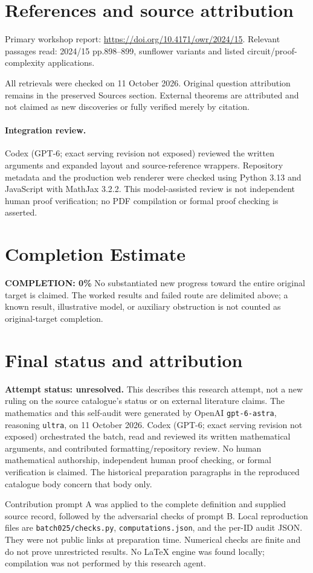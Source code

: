 \documentclass[11pt]{article}
\begin{document}
\section{References and source attribution}
Primary workshop report: \url{https://doi.org/10.4171/owr/2024/15}. Relevant passages read: 2024/15 pp.898--899, sunflower variants and listed circuit/proof-complexity applications.

All retrievals were checked on 11 October 2026. Original question attribution remains in the preserved Sources section. External theorems are attributed and not claimed as new discoveries or fully verified merely by citation.


\paragraph{Integration review.} Codex (GPT-6; exact serving revision not exposed) reviewed the written arguments and expanded layout and source-reference wrappers. Repository metadata and the production web renderer were checked using Python 3.13 and JavaScript with MathJax 3.2.2. This model-assisted review is not independent human proof verification; no PDF compilation or formal proof checking is asserted.

\section{Completion Estimate}
\noindent\textbf{COMPLETION: 0\%}
No substantiated new progress toward the entire original target is claimed. The worked results and failed route are delimited above; a known result, illustrative model, or auxiliary obstruction is not counted as original-target completion.

\section{Final status and attribution}
\textbf{Attempt status: unresolved.} This describes this research attempt, not a new ruling on the source catalogue's status or on external literature claims.
The mathematics and this self-audit were generated by OpenAI \texttt{gpt-6-astra}, reasoning \texttt{ultra}, on 11 October 2026. Codex (GPT-6; exact serving revision not exposed) orchestrated the batch, read and reviewed its written mathematical arguments, and contributed formatting/repository review. No human mathematical authorship, independent human proof checking, or formal verification is claimed. The historical preparation paragraphs in the reproduced catalogue body concern that body only.

Contribution prompt A was applied to the complete definition and supplied source record, followed by the adversarial checks of prompt B. Local reproduction files are \texttt{batch025/checks.py}, \texttt{computations.json}, and the per-ID audit JSON. They were not public links at preparation time. Numerical checks are finite and do not prove unrestricted results. No LaTeX engine was found locally; compilation was not performed by this research agent.
\end{document}
